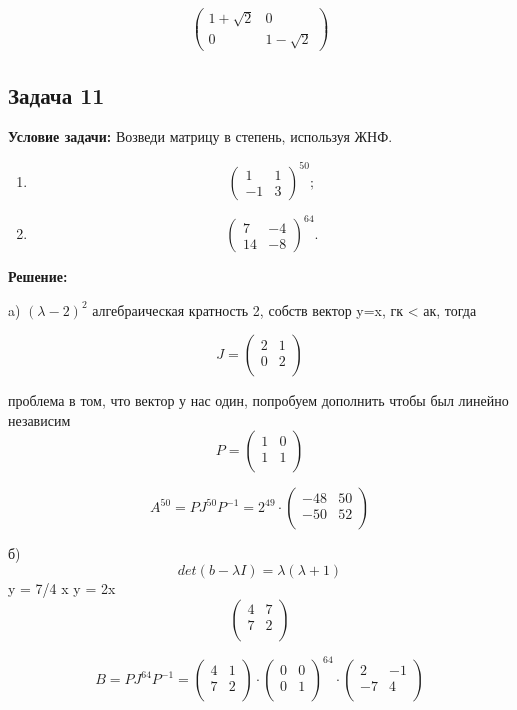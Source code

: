 \documentclass[a4paper,12pt]{article}
\begin{document}
\[
\begin{pmatrix}
    1+\sqrt{2} & 0 \\
    0 & 1-\sqrt{2}
\end{pmatrix}
\]

\subsection{Задача 11}
\textbf{Условие задачи:} Возведи матрицу в степень, используя ЖНФ.
\begin{enumerate}
    \item 
    \[
    \begin{pmatrix}
    1 & 1 \\
    -1 & 3
    \end{pmatrix}^{50};
    \]
    \item 
    \[
    \begin{pmatrix}
    7 & -4 \\
    14 & -8
    \end{pmatrix}^{64}.
    \]
\end{enumerate}

\textbf{Решение: }

a) $(\lambda - 2)^2 $ алгебраическая кратность 2, собств вектор y=x, гк < ак, тогда 

\[
J = \begin{pmatrix}
    2 & 1 \\
    0 & 2 \\
\end{pmatrix}
\]


проблема в том, что вектор у нас один, попробуем дополнить чтобы был линейно независим
\[
P =
\begin{pmatrix}
    1 & 0 \\
    1 & 1 \\
\end{pmatrix}
\]

\[
A^{50} = PJ^{50}P^{-1} = 2^{49} \cdot \begin{pmatrix}
    -48 & 50 \\
    -50 & 52 \\
\end{pmatrix}
\]

б)
\[
det(b - \lambda I) = \lambda(\lambda + 1)
\]
y = 7/4 x
y = 2x
\[
\begin{pmatrix}
    4 & 7 \\
    7 & 2\\
\end{pmatrix}
\]

\[
B = PJ^{64}P^{-1} = \begin{pmatrix}
    4 & 1 \\
    7 & 2 \\
\end{pmatrix} \cdot \begin{pmatrix}
    0 & 0 \\
    0 & 1 \\
\end{pmatrix}^{64} \cdot \begin{pmatrix}
    2 & -1 \\
    -7 & 4\\
\end{pmatrix}
\]
\end{document}
